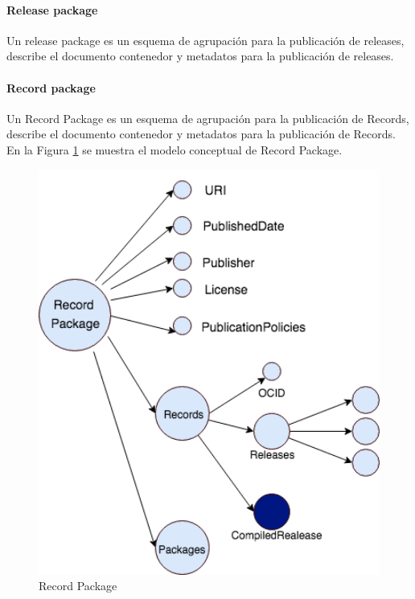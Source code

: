 \paragraph{Release package}
Un release package es un esquema de agrupación para la publicación de releases, describe el documento contenedor y metadatos para la publicación de releases.

\paragraph{Record package}

Un Record Package es un esquema de agrupación para la publicación de Records, describe el documento contenedor y metadatos para la publicación de Records. En la Figura \ref{img:Record Package} se muestra el modelo conceptual de Record Package.



\begin{figure}[h!]
    \centering
    \includegraphics[width=150mm]{figuras/Diagramas-RecordPackage.png}
    \caption{Record Package}
    \label{img:Record Package}
\end{figure}


